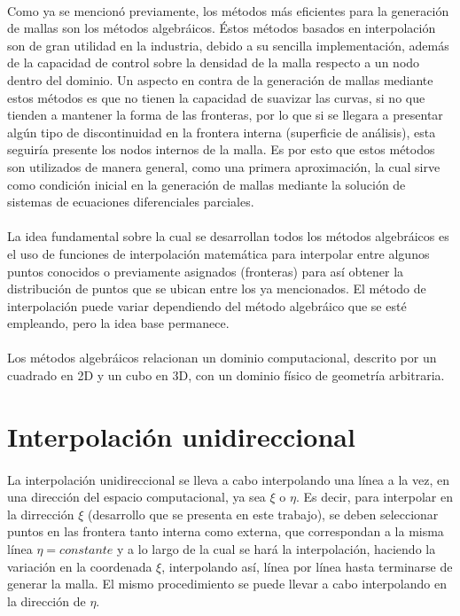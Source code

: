 \documentclass[letterpaper, openright, 12pt]{book}
\begin{document}
	\paragraph*{}
		Como ya se mencionó previamente, los métodos más eficientes para la generación de mallas son los métodos algebráicos. Éstos métodos basados en interpolación son de gran utilidad en la industria, debido a su sencilla implementación, además de la capacidad de control sobre la densidad de la malla respecto a un nodo dentro del dominio. Un aspecto en contra de la generación de mallas mediante estos métodos es que no tienen la capacidad de suavizar las curvas, si no que tienden a mantener la forma de las fronteras, por lo que si se llegara a presentar algún tipo de discontinuidad en la frontera interna (superficie de análisis), esta seguiría presente los nodos internos de la malla. Es por esto que estos métodos son utilizados de manera general, como una primera aproximación, la cual sirve como condición inicial en la generación de mallas mediante la solución de sistemas de ecuaciones diferenciales parciales.\cite{farrashkhalvat}
	\paragraph*{}
		La idea fundamental sobre la cual se desarrollan todos los métodos algebráicos es el uso de funciones de interpolación matemática para interpolar entre algunos puntos conocidos o previamente asignados (fronteras) para así obtener la distribución de puntos que se ubican entre los ya mencionados. El método de interpolación puede variar dependiendo del método algebráico que se esté empleando, pero la idea base permanece. \cite{siladic-grid-generation}
	\paragraph*{}
		Los métodos algebráicos relacionan un dominio computacional, descrito por un cuadrado en 2D y un cubo en 3D, con un dominio físico de geometría arbitraria.
		
		
	\section{Interpolación unidireccional}
		\paragraph*{}
			La interpolación unidireccional se lleva a cabo interpolando una línea a la vez, en una dirección del espacio computacional, ya sea $\xi$ o $\eta$. Es decir, para interpolar en la dirrección $\xi$ (desarrollo que se presenta en este trabajo), se deben seleccionar puntos en las frontera tanto interna como externa, que correspondan a la misma línea $\eta = constante$ y a lo largo de la cual se hará la interpolación, haciendo la variación en la coordenada $\xi$, interpolando así, línea por línea hasta terminarse de generar la malla. El mismo procedimiento se puede llevar a cabo interpolando en la dirección de $\eta$.
\end{document}
